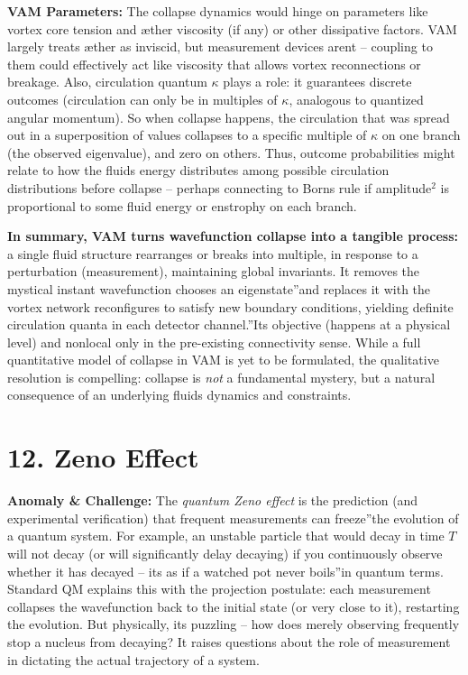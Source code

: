 \documentclass[a4paper, aps,preprint,superscriptaddress, 12pt]{revtex4}
\begin{document}
\textbf{VAM Parameters:} The collapse dynamics would hinge on parameters like vortex core tension and æther viscosity (if any) or other dissipative factors. VAM largely treats æther as inviscid, but measurement devices aren\rqs t – coupling to them could effectively act like viscosity that allows vortex reconnections or breakage. Also, circulation quantum $\kappa$ plays a role: it guarantees discrete outcomes (circulation can only be in multiples of $\kappa$, analogous to quantized angular momentum). So when collapse happens, the circulation that was spread out in a superposition of values collapses to a specific multiple of $\kappa$ on one branch (the observed eigenvalue), and zero on others. Thus, outcome probabilities might relate to how the fluid\rqs s energy distributes among possible circulation distributions before collapse – perhaps connecting to Born\rqs s rule if amplitude$^2$ is proportional to some fluid energy or enstrophy on each branch.


\textbf{In summary, VAM turns wavefunction collapse into a tangible process:} a single fluid structure rearranges or breaks into multiple, in response to a perturbation (measurement), maintaining global invariants. It removes the mystical instant \grqq wavefunction chooses an eigenstate\textquotedblright and replaces it with \grqq the vortex network reconfigures to satisfy new boundary conditions, yielding definite circulation quanta in each detector channel.\textquotedblright It\rqs s objective (happens at a physical level) and nonlocal only in the pre-existing connectivity sense. While a full quantitative model of collapse in VAM is yet to be formulated, the qualitative resolution is compelling: collapse is \textit{not} a fundamental mystery, but a natural consequence of an underlying fluid\rqs s dynamics and constraints.


\section*{12. Zeno Effect}

\textbf{Anomaly \& Challenge: } The \textit{quantum Zeno effect} is the prediction (and experimental verification) that frequent measurements can \grqq freeze\textquotedblright the evolution of a quantum system. For example, an unstable particle that would decay in time $T$ will not decay (or will significantly delay decaying) if you continuously observe whether it has decayed – it\rqs s as if \grqq a watched pot never boils\textquotedblright in quantum terms. Standard QM explains this with the projection postulate: each measurement collapses the wavefunction back to the initial state (or very close to it), restarting the evolution. But physically, it\rqs s puzzling – how does merely observing frequently stop a nucleus from decaying? It raises questions about the role of measurement in dictating the actual trajectory of a system.
\end{document}
